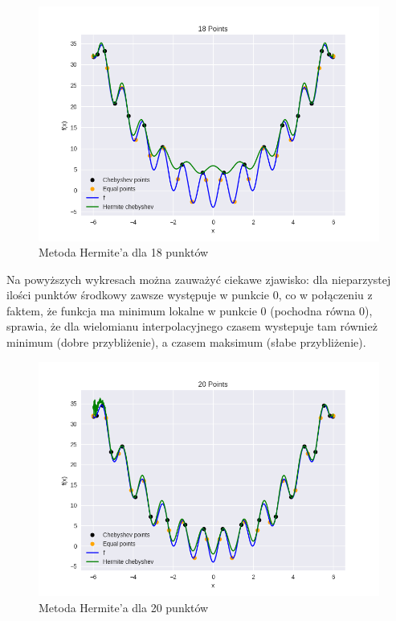 \documentclass{article}
\begin{document}
\begin{figure}[H]
    \centering
    \includegraphics[width=\textwidth]{img/herm_18.png}
    \caption{Metoda Hermite'a dla 18 punktów}
\end{figure}

Na powyższych wykresach można zauważyć ciekawe zjawisko: dla nieparzystej ilości punktów środkowy zawsze występuje w punkcie 0, co
w połączeniu z faktem, że funkcja ma minimum lokalne w punkcie 0 (pochodna równa 0), sprawia, że dla wielomianu interpolacyjnego czasem
wystepuje tam również minimum (dobre przybliżenie), a czasem maksimum (słabe przybliżenie).

\begin{figure}[H]
    \centering
    \includegraphics[width=\textwidth]{img/herm_20.png}
    \caption{Metoda Hermite'a dla 20 punktów}
\end{figure}
\end{document}
